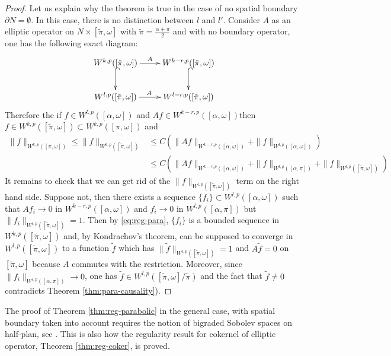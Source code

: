 \begin{proof}
Let us explain why the theorem is true in the case of no spatial boundary \(\partial N
=\emptyset\). In this case, there is no distinction between \(l\) and \(l'\). Consider \(A\) as an elliptic operator on \(N\times [\tilde\pi,\omega]\) with \(\tilde\pi = \frac{\alpha +\pi}{2}\) and with no boundary operator, one has the following exact diagram:
\[
\xymatrix{
W^{k,p}([\tilde\pi,\omega]) \ar@{^{(}->}[d] \ar@{->}[r]^<<<<<{{A}} & W^{k-r,p}([\tilde\pi,\omega])   \ar@{^{(}->}[d] \\
W^{l,p}([\tilde\pi,\omega]) \ar@{->}[r]^<<<<<{{A}} & W^{l-r,p}([\tilde\pi,\omega])
}
\]
Therefore the if \(f\in W^{l,p}([\alpha,\omega])\) and \(Af \in W^{k-r,p}([\alpha,\omega])\)then \(f \in W^{k,p}([\tilde\pi,\omega])\subset W^{k,p}([\pi,\omega])\) and 
\begin{align}
\|f\|_{W^{k,p}([\pi,\omega])} \leq \|f\|_{W^{k,p}([\tilde\pi,\omega])} &\leq C \left( \|Af\|_{W^{k-r,p}([\alpha,\omega])} + \| f \|_{W^{l,p}([\alpha,\omega])}  \right) \\ 
			      	   &\leq C \left( \|Af\|_{W^{k-r,p}([\alpha,\omega])} + \| f \|_{W^{l,p}([\alpha,\pi])} + \| f \|_{W^{l,p}([\tilde\pi,\omega])} \right) \label{eq:reg-para}
\end{align}
It remains to check that we can get rid of the \(\| f \|_{W^{l,p}([\tilde\pi,\omega])}\) 
term on the right hand side. Suppose not, then there exists a sequence \(\{f_i\} \subset
W^{l,p}([\alpha,\omega])\) such that \(Af_i \to 0\) in \(W^{k-r,p}([\alpha,\omega])\) and
\(f_i \to 0\) in \(W^{l,p}([\alpha,\pi])\) but \(\| f_i\|_{W^{l,p}([\tilde\pi,\omega])} =
1\). Then by \eqref{eq:reg-para}, \(\{f_i\}\) is a bounded sequence in \(W^{k,p}([\tilde\pi,\omega])\) and, by
Kondrachov's theorem, can be supposed to converge in \(W^{l,p}([\tilde\pi,\omega])\) to a
function \(\tilde f\) which has \(\| \tilde f \|_{W^{l,p}([\tilde\pi,\omega])} =
1\) and \(A\tilde f = 0\) on \([\tilde\pi,\omega]\) because \(A\) commutes with the restriction. Moreover, since \(\|f_i\|_{W^{l,p}([\alpha,\pi])} \to 0\), one has \(\tilde f\in W^{l,p}([\tilde\pi,\omega]/\tilde\pi)\) and the fact that \(\tilde f\ne 0\) contradicts Theorem \ref{thm:para-causality}).
\end{proof}

\begin{remark}
The proof of Theorem \ref{thm:reg-parabolic} in the general case, with spatial boundary
taken into account requires the notion of bigraded Sobolev spaces on half-plan, see
\cite[page 97-100]{hamilton_harmonic_1975}. This is also how the regularity result for
cokernel of elliptic operator, Theorem \ref{thm:reg-coker}, is proved.
\end{remark}


